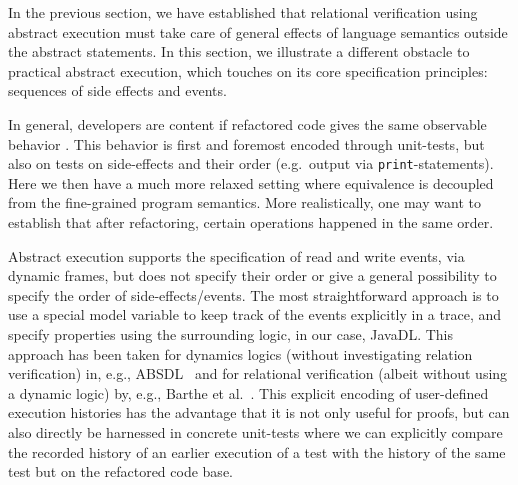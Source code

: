 In the previous section, we have established that relational verification using abstract execution
must take care of general effects of language semantics outside the abstract statements.
In this section, we illustrate a different obstacle to practical abstract execution, which touches on its core specification principles: sequences of side effects and events.

In general, developers are content if refactored code gives the same observable behavior \cite{needed}.
This behavior is first and foremost encoded through unit-tests, but also on tests on side-effects and their order (e.g.\ output via \texttt{print}-statements).
Here we then have a much more relaxed setting where equivalence is decoupled from the fine-grained program semantics.
More realistically, one may want to establish that after refactoring, certain operations happened in the same order.

Abstract execution supports the specification of read and write events, via dynamic frames, but does not specify their order or give a general possibility to
specify the order of side-effects/events. The most straightforward approach is to use a special model variable to keep track of the events explicitly in a trace, 
and specify properties using the surrounding logic, in our case, JavaDL. This approach has been taken for dynamics logics (without investigating relation verification) in, e.g., ABSDL~\cite{DBLP:journals/jlp/DinO14} and for relational verification (albeit without using a dynamic logic) by, e.g., Barthe et al.~\cite{DBLP:conf/fmcad/BartheEGGKM19}.
This explicit encoding of user-defined execution histories has the advantage that it is not only useful for proofs, but can also directly be harnessed in concrete unit-tests where we can explicitly compare the recorded history of an earlier execution of a test with the history of the same test but on the refactored code base.

